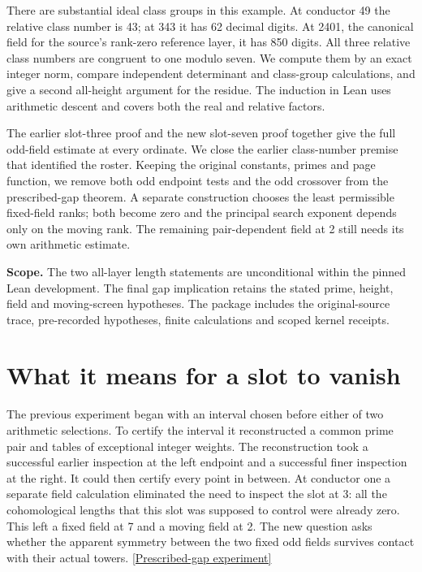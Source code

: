 \documentclass[12pt,letterpaper]{article}
\begin{document}
There are substantial ideal class groups in this example. At conductor 49 the relative class number is 43; at 343 it has 62 decimal digits. At 2401, the canonical field for the source's rank-zero reference layer, it has 850 digits. All three relative class numbers are congruent to one modulo seven. We compute them by an exact integer norm, compare independent determinant and class-group calculations, and give a second all-height argument for the residue. The induction in Lean uses arithmetic descent and covers both the real and relative factors.

The earlier slot-three proof and the new slot-seven proof together give the full odd-field estimate at every ordinate. We close the earlier class-number premise that identified the roster. Keeping the original constants, primes and page function, we remove both odd endpoint tests and the odd crossover from the prescribed-gap theorem. A separate construction chooses the least permissible fixed-field ranks; both become zero and the principal search exponent depends only on the moving rank. The remaining pair-dependent field at 2 still needs its own arithmetic estimate.
\par\medskip
\textbf{Scope.} The two all-layer length statements are unconditional within the pinned Lean development. The final gap implication retains the stated prime, height, field and moving-screen hypotheses. The package includes the original-source trace, pre-recorded hypotheses, finite calculations and scoped kernel receipts.
\clearpage
\tableofcontents
\clearpage
{}


\section{What it means for a slot to vanish}
The previous experiment began with an interval chosen before either of two arithmetic selections. To certify the interval it reconstructed a common prime pair and tables of exceptional integer weights. The reconstruction took a successful earlier inspection at the left endpoint and a successful finer inspection at the right. It could then certify every point in between. At conductor one a separate field calculation eliminated the need to inspect the slot at 3: all the cohomological lengths that this slot was supposed to control were already zero. This left a fixed field at 7 and a moving field at 2. The new question asks whether the apparent symmetry between the two fixed odd fields survives contact with their actual towers. \href{https://github.com/nousentllc/riemann-hypothesis/pull/19}{[Prescribed-gap experiment]}
\end{document}
